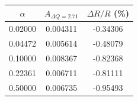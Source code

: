 \begin{tabular}{ccc}
\hline\hline
$\alpha$ & $A_{\Delta Q=2.71}$ & $\Delta R/R$ (\%) \\
\hline
0.02000 & 0.004311 & -0.34306 \\
0.04472 & 0.005614 & -0.48079 \\
0.10000 & 0.008367 & -0.82368 \\
0.22361 & 0.006711 & -0.81111 \\
0.50000 & 0.006735 & -0.95493 \\
\hline\hline
\end{tabular}
